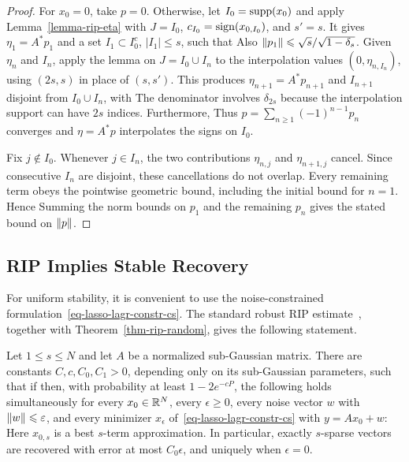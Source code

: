 \begin{proof}
For $x_0=0$, take $p=0$. Otherwise, let $I_0=\operatorname{supp}(x_0)$ and apply Lemma~\ref{lemma-rip-eta} with $J=I_0$, $c_{I_0}=\operatorname{sign}(x_{0,I_0})$, and $s'=s$. It gives $\eta_1=A^*p_1$ and a set $I_1\subset I_0^c$, $|I_1|\leq s$, such that
Also $\lVert p_1\rVert\leqslant\sqrt{s}/\sqrt{1-\delta_s}$.
Given $\eta_n$ and $I_n$, apply the lemma on $J=I_0\cup I_n$ to the interpolation values $(0,\eta_{n,I_n})$, using $(2s,s)$ in place of $(s,s')$. This produces $\eta_{n+1}=A^*p_{n+1}$ and $I_{n+1}$ disjoint from $I_0\cup I_n$, with
The denominator involves $\delta_{2s}$ because the interpolation support can have $2s$ indices. Furthermore,
Thus $p=\sum_{n\geq1}(-1)^{n-1}p_n$ converges and $\eta=A^*p$ interpolates the signs on $I_0$.

Fix $j\notin I_0$. Whenever $j\in I_n$, the two contributions $\eta_{n,j}$ and $\eta_{n+1,j}$ cancel. Since consecutive $I_n$ are disjoint, these cancellations do not overlap. Every remaining term obeys the pointwise geometric bound, including the initial bound for $n=1$. Hence
Summing the norm bounds on $p_1$ and the remaining $p_n$ gives the stated bound on $\lVert p\rVert$.
\end{proof}

\subsection{RIP Implies Stable Recovery}


For uniform stability, it is convenient to use the noise-constrained formulation~\eqref{eq-lasso-lagr-constr-cs}. The standard robust RIP estimate~\cite{candes-cras}, together with Theorem~\ref{thm-rip-random}, gives the following statement.

\begin{thm}\label{thm-rip-final}
Let $1\leq s\leq N$ and let $A$ be a normalized sub-Gaussian matrix. There are constants $C,c,C_0,C_1>0$, depending only on its sub-Gaussian parameters, such that if
then, with probability at least $1-2e^{-cP}$, the following holds simultaneously for every $x_0\in\mathbb{R}^N$, every $\epsilon\geq0$, every noise vector $w$ with $\lVert w\rVert\leqslant\varepsilon$, and every minimizer $x_\epsilon$ of~\eqref{eq-lasso-lagr-constr-cs} with $y=Ax_0+w$:
Here $x_{0,s}$ is a best $s$-term approximation. In particular, exactly $s$-sparse vectors are recovered with error at most $C_0\epsilon$, and uniquely when $\epsilon=0$.
\end{thm}

